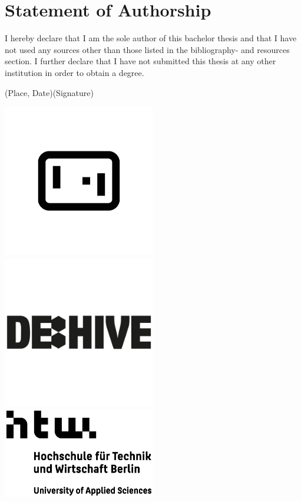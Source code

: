 \documentclass[a4paper, twoside, 10pt]{report}
\begin{document}
\chapter*{Statement of Authorship}
I hereby declare that I am the sole author of this bachelor thesis and that I have not used any sources other than those listed in the bibliography- and resources section. I further declare that I have not submitted this thesis at any other institution in order to obtain a degree.
\begin{spacing}{4}
\noindent
(Place, Date)\dotfill \space (Signature)\dotfill
\end{spacing}



\newpage
\pagestyle{empty}
\centering
\vfill
\includegraphics[width=0.5\textwidth]{Images/logo_GD_black.jpg}
\vfill
\vspace*{-2cm}
\includegraphics[width=0.5\textwidth]{Images/logo_dehive.jpg}
\vfill
\includegraphics[width=0.5\textwidth]{Images/logo_htw.jpg}
\vfill
\end{document}
